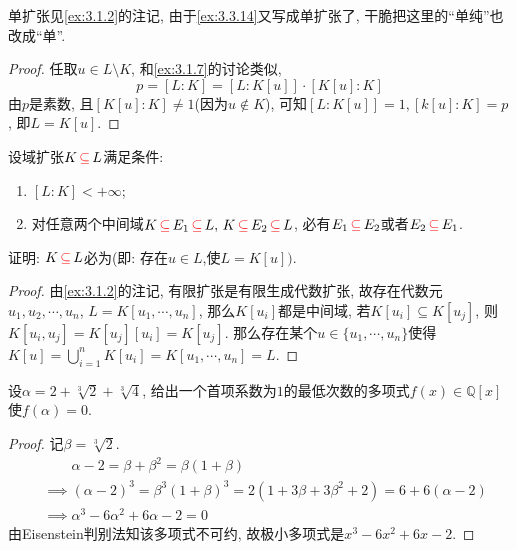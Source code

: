 \begin{remark}
    单扩张见\ref{ex:3.1.2}的注记, 由于\ref{ex:3.3.14}又写成单扩张了, 干脆把这里的“单纯”也改成“单”.
\end{remark}

\begin{proof}
    任取$u \in L \setminus K$, 和\ref{ex:3.1.7}的讨论类似,
    \[
        p = [L:K] = [L:K[u]] \cdot [K[u]:K]
    \]
    由$p$是素数, 且$[K[u]:K] \neq 1$(因为$u \notin K$), 可知$[L:K[u]] = 1, [k[u]:K] = p$, 即$L = K[u]$.
\end{proof}

\begin{problem}
    设域扩张$K \,\textcolor{red}{\subseteq}\, L$满足条件:
    \begin{enumerate}[(1)]
        \item $[L:K] < +\infty$;
        \item 对任意两个中间域$K \,\textcolor{red}{\subseteq}\, E_1 \,\textcolor{red}{\subseteq}\, L,\, K \,\textcolor{red}{\subseteq}\, E_2 \,\textcolor{red}{\subseteq}\, L$, 必有$E_1 \,\textcolor{red}{\subseteq}\, E_2$或者$E_2 \,\textcolor{red}{\subseteq}\, E_1$.
    \end{enumerate}
    证明: $K \,\textcolor{red}{\subseteq}\, L$必为(即: 存在$u \in L$,使$L = K[u])$.
\end{problem}

\begin{proof}
    由\ref{ex:3.1.2}的注记, 有限扩张是有限生成代数扩张, 故存在代数元$u_1, u_2, \cdots, u_n$, $L = K[u_1, \cdots, u_n]$, 那么$K[u_i]$都是中间域, 若$K[u_i] \subseteq K[u_j]$, 则$K[u_i, u_j] = K[u_j][u_i] = K[u_j]$. 那么存在某个$u \in \{u_1, \cdots, u_n\}$使得$K[u] = \bigcup_{i = 1}^{n} K[u_i] = K[u_1, \cdots, u_n] = L$.
\end{proof}

\begin{problem}
    设$\alpha = 2 + \sqrt[3]{2} + \sqrt[3]{4}$, 给出一个首项系数为$1$的最低次数的多项式$f(x) \in \mathbb{Q}[x]$使$f(\alpha) = 0$.
\end{problem}

\begin{proof}
    记$\beta = \sqrt[3]{2}$.
    \[
    \begin{aligned}
        &\phantom{\implies} \alpha - 2 = \beta + \beta^2 = \beta(1 + \beta)\\
        &\implies (\alpha - 2)^3 = \beta^3(1 + \beta)^3 = 2(1 + 3\beta + 3\beta^2 + 2) = 6 + 6(\alpha - 2)\\
        &\implies \alpha^3 - 6\alpha^2 + 6\alpha - 2 = 0
    \end{aligned}  
    \]
    由Eisenstein判别法知该多项式不可约, 故极小多项式是$x^3 - 6x^2 + 6x - 2$.
\end{proof}

